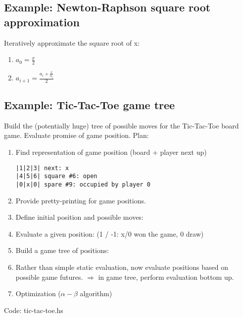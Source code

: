 \subsection{Example: Newton-Raphson square root approximation}
Iteratively approximate the square root of x:
\begin{enumerate}
   \item $a_0 = \tfrac{x}{2}$
   \item $a_{i+1} = \tfrac{a_i+\tfrac{x}{a_i}}{2}$
\end{enumerate}


%

\subsection{Example: Tic-Tac-Toe game tree}
Build the (potentially huge) tree of possible moves for the Tic-Tac-Toe board game. Evaluate promise of game position. 
Plan:
\begin{enumerate}
   \item Find representation of game position (board + player next up)
\begin{verbatim}
|1|2|3| next: x
|4|5|6| square #6: open 
|0|x|0| spare #9: occupied by player 0
\end{verbatim}
   \item Provide pretty-printing for game positions.
   \item Define initial position and possible moves: 
   \item Evaluate a given position:  (1 / -1: x/0 won the game, 0 draw)
   \item Build a game tree of positions: 
   \item Rather than simple static evaluation, now evaluate positions based on possible game futures. $\Rightarrow$ in game tree, perform evaluation bottom up.
   \item Optimization ($\alpha-\beta$ algorithm)
\end{enumerate}

Code: tic-tac-toe.hs
